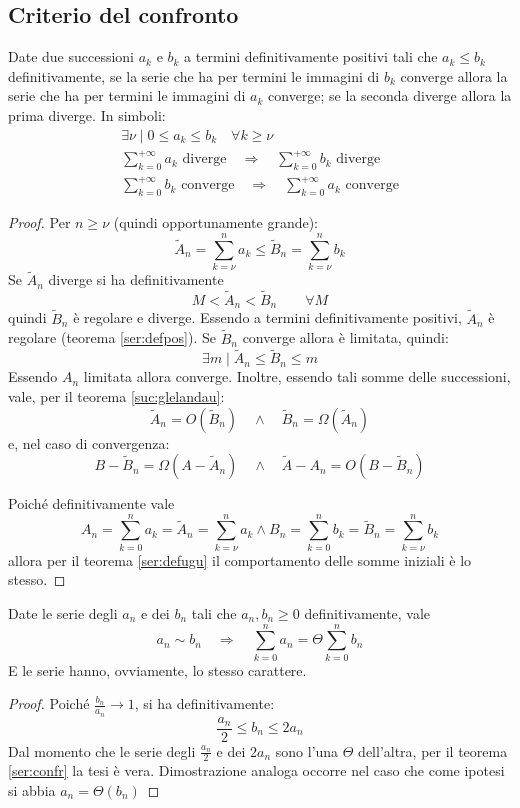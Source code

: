 \subsection{Criterio del confronto}
\begin{teor}
	\label{ser:confr}
	Date due successioni $a_k$ e $b_k$ a termini definitivamente positivi tali che $a_k\leq b_k$ definitivamente, se la serie che ha per termini le immagini di $b_k$ converge allora la serie che ha per termini le immagini di $a_k$ converge; se la seconda diverge allora la prima diverge. In simboli:
	\begin{gather*}
		\exists\nu\mid 0\leq a_k\leq b_k \quad\forall k\geq\nu\\
		\sum_{k=0}^{+\infty} a_k \text{ diverge}\quad\Rightarrow\quad \sum_{k=0}^{+\infty} b_k \text{ diverge}\\
		\sum_{k=0}^{+\infty} b_k \text{ converge}\quad\Rightarrow\quad \sum_{k=0}^{+\infty} a_k \text{ converge}
	\end{gather*}
\end{teor}
\begin{proof}
	Per $n\geq\nu$ (quindi opportunamente grande):
	\[
		\tilde A_n=\sum_{k=\nu}^n a_k\leq \tilde B_n=\sum_{k=\nu}^n b_k
	\]
	Se $\tilde A_n$ diverge si ha definitivamente
	\[
		M<\tilde A_n<\tilde B_n\qquad\forall M
	\]
	quindi $\tilde B_n$ è regolare e diverge. Essendo a termini definitivamente positivi, $\tilde A_n$ è regolare (teorema \ref{ser:defpos}). Se $\tilde B_n$ converge allora è limitata, quindi:
	\[
		\exists m \mid \tilde A_n \leq \tilde B_n\leq m
	\]
	Essendo $A_n$ limitata allora converge. Inoltre, essendo tali somme delle successioni, vale, per il teorema \vref{suc:glelandau}:
	\begin{equation}
		\tilde A_n =O(\tilde B_n)\quad\land\quad\tilde B_n =\Omega(\tilde A_n)
	\end{equation}
	e, nel caso di convergenza:
	\begin{equation}
		B-\tilde B_n=\Omega(A-\tilde A_n)\quad\land\quad\tilde A-A_n=O(B-\tilde B_n)
	\end{equation}

	Poiché definitivamente vale
	\[
		A_n=\sum_{k=0}^n a_k=\tilde A_n=\sum_{k=\nu}^n a_k\land B_n=\sum_{k=0}^n b_k=\tilde B_n=\sum_{k=\nu}^n b_k
	\]
	allora per il teorema \ref{ser:defugu} il comportamento delle somme iniziali è lo stesso.
\end{proof}
\begin{corol}
	\label{ser:confrasin}
	Date le serie degli $a_n$ e dei $b_n$ tali che $a_n,b_n\geq0$ definitivamente, vale
	\[
		a_n\sim b_n\quad\Rightarrow\quad \sum_{k=0}^n a_n=\Theta\sum_{k=0}^n b_n
	\]
	E le serie hanno, ovviamente, lo stesso carattere.
\end{corol}
\begin{proof}
	Poiché $\frac{b_n}{a_n}\to1$, si ha definitivamente:
	\[
		\frac{a_n}{2}\leq b_n\leq 2a_n
	\]
	Dal momento che le serie degli $\frac{a_n}{2}$ e dei $2a_n$ sono l'una $\Theta$ dell'altra, per il teorema \ref{ser:confr} la tesi è vera. Dimostrazione analoga occorre nel caso che come ipotesi si abbia $a_n=\Theta(b_n)$
\end{proof}

